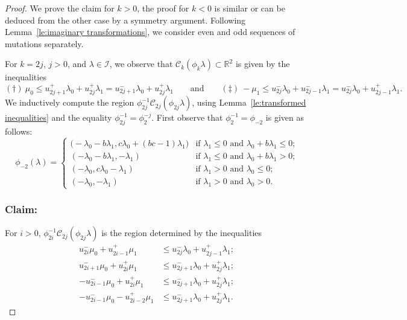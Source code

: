\documentclass{amsart}
\numberwithin{theorem}{section}
\newcommand{\cC}{\mathcal{C}}
\newcommand{\cI}{\mathcal{I}}
\newcommand{\RR}{\mathbb{R}}
\begin{document}
  \begin{proof}
    We prove the claim for $k>0$, the proof for $k<0$ is similar or can be deduced from the other case by a symmetry argument.
    Following Lemma~\ref{le:imaginary transformations}, we consider even and odd sequences of mutations separately.

    For $k=2j$, $j>0$, and $\lambda\in\cI$, we observe that $\cC_k(\phi_k\lambda)\subset\RR^2$ is given by the inequalities 
    \[ (\dagger)\ \mu_0 \le u_{2j+1}^+\lambda_0+u_{2j}^+\lambda_1 = u_{2j+1}^-\lambda_0+u_{2j}^+\lambda_1 \qquad\text{and}\qquad (\ddagger)\ -\mu_1\le u_{2j}^-\lambda_0+u_{2j-1}^-\lambda_1 = u_{2j}^-\lambda_0+u_{2j-1}^+\lambda_1. \]
    We inductively compute the region $\phi_{2j}^{-1}\cC_{2j}(\phi_{2j}\lambda)$, using Lemma~\ref{le:transformed inequalities} and the equality $\phi_{2j}^{-1}=\phi_2^{-j}$.
    First observe that $\phi_2^{-1}=\phi_{-2}$ is given as follows:
    \begin{equation}
      \label{eq:backward two step mutation}
      \phi_{-2}(\lambda)
      =
      \begin{cases}
        \big(-\lambda_0-b\lambda_1, c\lambda_0+(bc-1)\lambda_1\big) & \text{if $\lambda_1\le 0$ and $\lambda_0+b\lambda_1\le 0$;}\\
        (-\lambda_0-b\lambda_1, -\lambda_1) & \text{if $\lambda_1\le 0$ and $\lambda_0+b\lambda_1>0$;}\\
        (-\lambda_0, c\lambda_0-\lambda_1) & \text{if $\lambda_1>0$ and $\lambda_0\le 0$;}\\
        (-\lambda_0,-\lambda_1) & \text{if $\lambda_1>0$ and $\lambda_0>0$.}
      \end{cases}
    \end{equation}

    \subsubsection*{Claim:} For $i>0$, $\phi_{2i}^{-1}\cC_{2j}(\phi_{2j}\lambda)$ is the region determined by the inequalities 
    \begin{align*}
      \tag{a} u_{2i}^-\mu_0+u_{2i-1}^+\mu_1 &\le u_{2j}^-\lambda_0+u_{2j-1}^+\lambda_1;\\
      \tag{b} u_{2i+1}^-\mu_0+u_{2i}^+\mu_1 &\le u_{2j+1}^-\lambda_0+u_{2j}^+\lambda_1;\\
      \tag{c} -u_{2i-1}^-\mu_0+u_{2i}^+\mu_1 &\le u_{2j+1}^-\lambda_0+u_{2j}^+\lambda_1;\\
      \tag{d} -u_{2i-1}^-\mu_0-u_{2i-2}^+\mu_1 &\le u_{2j+1}^-\lambda_0+u_{2j}^+\lambda_1.
    \end{align*}


\end{proof}
\end{document}
